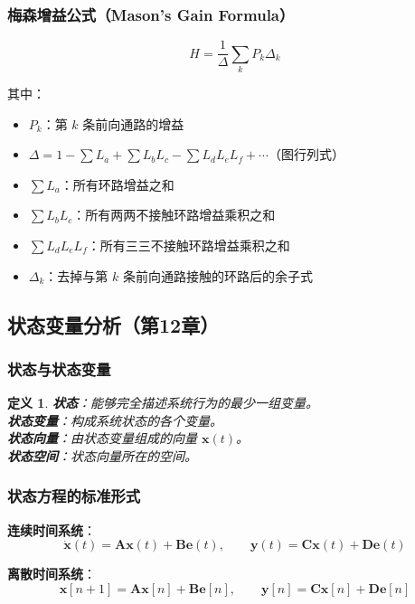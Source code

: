 \documentclass[11pt,a4paper]{ctexart}
\newtheorem{definition}{定义}[section]
\begin{document}
\subsubsection{梅森增益公式（Mason's Gain Formula）}
\[
\boxed{H = \frac{1}{\Delta}\sum_k P_k \Delta_k}
\]

其中：
\begin{itemize}
    \item $P_k$：第 $k$ 条前向通路的增益
    \item $\Delta = 1 - \sum L_a + \sum L_b L_c - \sum L_d L_e L_f + \cdots$（图行列式）
    \item $\sum L_a$：所有环路增益之和
    \item $\sum L_b L_c$：所有两两不接触环路增益乘积之和
    \item $\sum L_d L_e L_f$：所有三三不接触环路增益乘积之和
    \item $\Delta_k$：去掉与第 $k$ 条前向通路接触的环路后的余子式
\end{itemize}

\subsection{状态变量分析（第12章）}

\subsubsection{状态与状态变量}
\begin{definition}
\textbf{状态}：能够完全描述系统行为的最少一组变量。\\
\textbf{状态变量}：构成系统状态的各个变量。\\
\textbf{状态向量}：由状态变量组成的向量 $\mathbf{x}(t)$。\\
\textbf{状态空间}：状态向量所在的空间。
\end{definition}

\subsubsection{状态方程的标准形式}

\textbf{连续时间系统}：
\[
\boxed{\dot{\mathbf{x}}(t) = \mathbf{A}\mathbf{x}(t) + \mathbf{B}\mathbf{e}(t)},\qquad
\boxed{\mathbf{y}(t) = \mathbf{C}\mathbf{x}(t) + \mathbf{D}\mathbf{e}(t)}
\]

\textbf{离散时间系统}：
\[
\boxed{\mathbf{x}[n+1] = \mathbf{A}\mathbf{x}[n] + \mathbf{B}\mathbf{e}[n]},\qquad
\boxed{\mathbf{y}[n] = \mathbf{C}\mathbf{x}[n] + \mathbf{D}\mathbf{e}[n]}
\]
\end{document}
